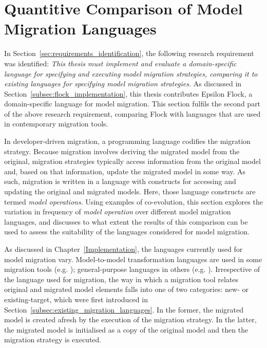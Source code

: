 
\section{Quantitive Comparison of Model Migration Languages}
\label{sec:quantitive}
In Section~\ref{sec:requirements_identification}, the following research requirement was identified: \emph{This thesis must implement and evaluate a domain-specific language for specifying and executing model migration strategies, comparing it to existing languages for specifying model migration strategies.} As discussed in Section~\ref{subsec:flock_implementation}, this thesis contributes Epsilon Flock, a domain-specific language for model migration. This section fulfils the second part of the above research requirement, comparing Flock with languages that are used in contemporary migration tools. 

In developer-driven migration, a programming language codifies the migration strategy. Because migration involves deriving the migrated model from the original, migration strategies typically access information from the original model and, based on that information, update the migrated model in some way. As such, migration is written in a language with constructs for accessing and updating the original and migrated models. Here, those language constructs are termed \textit{model operations}. Using examples of co-evolution, this section explores the variation in frequency of \emph{model operation} over different model migration languages, and discusses to what extent the results of this comparison can be used to assess the suitability of the languages considered for model migration.

As discussed in Chapter~\ref{Implementation}, the languages currently used for model migration vary. Model-to-model transformation languages are used in some migration tools (e.g. \cite{cicchetti08automating,garces09managing}); general-purpose languages in others (e.g. \cite{herrmannsdoerfer09cope,hussey06advanced}). Irrespective of the language used for migration, the way in which a migration tool relates original and migrated model elements falls into one of two categories: new- or existing-target, which were first introduced in Section~\ref{subsec:existing_migration_languages}. In the former, the migrated model is created afresh by the execution of the migration strategy. In the latter, the migrated model is initialised as a copy of the original model and then the migration strategy is executed.


